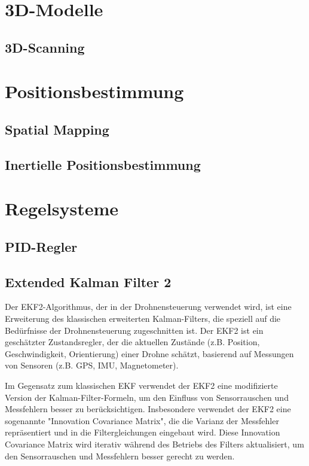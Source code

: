 \section{3D-Modelle} \label{3d-modelle:section}

    \subsection{3D-Scanning} \label{3d-scanning:subsection}

\section{Positionsbestimmung} \label{positionsbestimmung:section}

    \subsection{Spatial Mapping} \label{spatial_mapping:subsection}

    \subsection{Inertielle Positionsbestimmung} \label{inertielle_positionsbestimmung:subsection}

\section{Regelsysteme} \label{regelsysteme:section}

    \subsection{PID-Regler} \label{pid_regler:subsection}

    \subsection{Extended Kalman Filter 2}
    Der \ac{EKF}2-Algorithmus, der in der Drohnensteuerung verwendet wird, ist eine Erweiterung des klassischen erweiterten Kalman-Filters, die speziell auf die Bedürfnisse der Drohnensteuerung zugeschnitten ist. Der EKF2 ist ein geschätzter Zustandsregler, der die aktuellen Zustände (z.B. Position, Geschwindigkeit, Orientierung) einer Drohne schätzt, basierend auf Messungen von Sensoren (z.B. GPS, IMU, Magnetometer).

Im Gegensatz zum klassischen EKF verwendet der EKF2 eine modifizierte Version der Kalman-Filter-Formeln, um den Einfluss von Sensorrauschen und Messfehlern besser zu berücksichtigen. Insbesondere verwendet der EKF2 eine sogenannte "Innovation Covariance Matrix", die die Varianz der Messfehler repräsentiert und in die Filtergleichungen eingebaut wird. Diese Innovation Covariance Matrix wird iterativ während des Betriebs des Filters aktualisiert, um den Sensorrauschen und Messfehlern besser gerecht zu werden.

